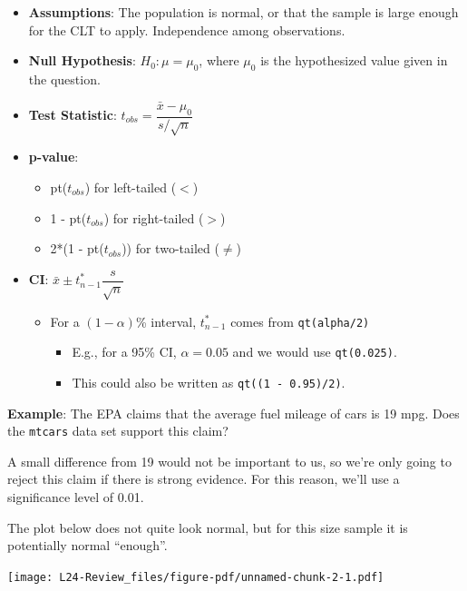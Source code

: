 \documentclass[
  letterpaper,
  DIV=11,
  numbers=noendperiod,
  oneside]{scrreprt}
\providecommand{\tightlist}{%
  \setlength{\itemsep}{0pt}\setlength{\parskip}{0pt}}\usepackage{longtable,booktabs,array}
\begin{document}
\begin{itemize}
\tightlist
\item
  \textbf{Assumptions}: The population is normal, or that the sample is
  large enough for the CLT to apply. Independence among observations.
\item
  \textbf{Null Hypothesis}: \(H_0:\mu = \mu_0\), where \(\mu_0\) is the
  hypothesized value given in the question.
\item
  \textbf{Test Statistic}:
  \(t_{obs} = \dfrac{\bar x - \mu_0}{s/\sqrt{n}}\)
\item
  \textbf{p-value}:

  \begin{itemize}
  \tightlist
  \item
    pt(\(t_{obs}\)) for left-tailed (\(<\))
  \item
    1 - pt(\(t_{obs}\)) for right-tailed (\(>\))
  \item
    2*(1 - pt(\textbar{}\(t_{obs}\)\textbar)) for two-tailed (\(\ne\))
  \end{itemize}
\item
  \textbf{CI}: \(\bar x \pm t_{n-1}^*\dfrac{s}{\sqrt{n}}\)

  \begin{itemize}
  \tightlist
  \item
    For a \((1-\alpha)\)\% interval, \(t^*_{n-1}\) comes from
    \texttt{qt(alpha/2)}

    \begin{itemize}
    \tightlist
    \item
      E.g., for a 95\% CI, \(\alpha = 0.05\) and we would use
      \texttt{qt(0.025)}.
    \item
      This could also be written as \texttt{qt((1\ -\ 0.95)/2)}.
    \end{itemize}
  \end{itemize}
\end{itemize}

\textbf{Example}: The EPA claims that the average fuel mileage of cars
is 19 mpg. Does the \texttt{mtcars} data set support this claim?

A small difference from 19 would not be important to us, so we're only
going to reject this claim if there is strong evidence. For this reason,
we'll use a significance level of 0.01.

The plot below does not quite look normal, but for this size sample it
is potentially normal ``enough''.

\texttt{[image: L24-Review\_files/figure-pdf/unnamed-chunk-2-1.pdf]}
\end{document}
